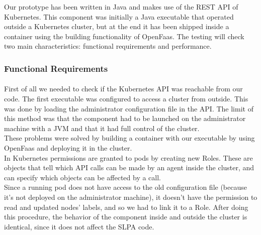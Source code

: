 Our prototype has been written in Java and makes use of the REST API of Kubernetes. 
This component was initially a Java executable that operated outside a Kubernetes cluster,
but at the end it has been shipped inside a container using the building functionality of OpenFaas.
The testing will check two main characteristics: functional requirements and performance.  
\\
\subsubsection*{Functional Requirements}
\paragraph{}
First of all we needed to check if the Kubernetes API was reachable from our code.
The first executable was configured to access a cluster from outside. This was done by loading
the administrator configuration file in the API.
The limit of this method was that the component had to be launched on the administrator machine with a JVM
and that it had full control of the cluster. 
\\
These problems were solved by building a container with our executable by using OpenFaas and deploying it
in the cluster.
\\
In Kubernetes permissions are granted to pods by creating new Roles. These are objects that tell which API 
calls can be made by an agent inside the cluster, and can specify which objects can be affected by a call.
\\
Since a running pod does not have access to the old configuration file (because it's not deployed on the administrator machine),
it doesn't have the permission to read and updated nodes' labels, and so we had to link it to a Role.
After doing this procedure, the behavior of the component inside and outside the cluster is identical,
since it does not affect the SLPA code.
